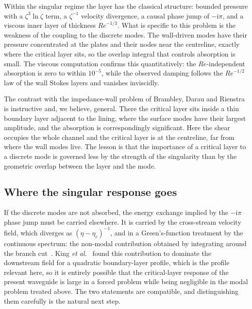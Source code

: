 \documentclass[11pt,a4paper]{article}
\newcommand{\ii}{\mathrm{i}}
\newcommand{\Rey}{\mathit{Re}}
\theoremstyle{plain}
\theoremstyle{remark}
\begin{document}
Within the singular regime the layer has the classical structure: bounded pressure with a
$\zeta^3\ln\zeta$ term, a $\zeta^{-1}$ velocity divergence, a causal phase jump of $-\ii\pi$, and a
viscous inner layer of thickness $\Rey^{-1/3}$. What is specific to this problem is the weakness of the
coupling to the discrete modes. The wall-driven modes have their pressure concentrated at the plates
and their nodes near the centreline, exactly where the critical layer sits, so the overlap integral
that controls absorption is small. The viscous computation confirms this quantitatively: the
$\Rey$-independent absorption is zero to within $10^{-5}$, while the observed damping follows the
$\Rey^{-1/2}$ law of the wall Stokes layers and vanishes inviscidly.

The contrast with the impedance-wall problem of Brambley, Darau and Rienstra~\cite{brambleydarau} is
instructive and, we believe, general. There the critical layer sits inside a thin boundary layer
adjacent to the lining, where the surface modes have their largest amplitude, and the absorption is
correspondingly significant. Here the shear occupies the whole channel and the critical layer is at
the centreline, far from where the wall modes live. The lesson is that the importance of a critical
layer to a discrete mode is governed less by the strength of the singularity than by the geometric
overlap between the layer and the mode.

\subsection{Where the singular response goes}
If the discrete modes are not absorbed, the energy exchange implied by the $-\ii\pi$ phase jump must be
carried elsewhere. It is carried by the cross-stream velocity field, which diverges as
$(\eta-\eta_c)^{-1}$, and in a Green's-function treatment by the continuous spectrum: the non-modal
contribution obtained by integrating around the branch cut~\cite{case,brambleydarau,king2022}. King
\emph{et al.}~\cite{king2022} found this contribution to dominate the downstream field for a quadratic
boundary-layer profile, which is the profile relevant here, so it is entirely possible that the
critical-layer response of the present waveguide is large in a forced problem while being negligible
in the modal problem treated above. The two statements are compatible, and distinguishing them
carefully is the natural next step.
\end{document}
